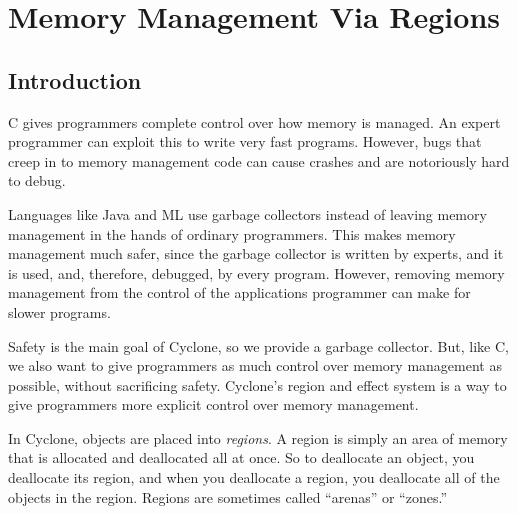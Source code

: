 \section{Memory Management Via Regions}


\subsection{Introduction}

C gives programmers complete control over how memory is managed.  An
expert programmer can exploit this to write very fast programs.
However, bugs that creep in to memory management code can cause
crashes and are notoriously hard to debug.

Languages like Java and ML use garbage collectors instead of leaving
memory management in the hands of ordinary programmers.  This makes
memory management much safer, since the garbage collector is written
by experts, and it is used, and, therefore, debugged, by every
program.  However, removing memory management from the control of the
applications programmer can make for slower programs.

Safety is the main goal of Cyclone, so we provide a garbage collector.
But, like C, we also want to give programmers as much control over
memory management as possible, without sacrificing safety.  Cyclone's
region and effect system is a way to give programmers more explicit
control over memory management.

In Cyclone, objects are placed into \emph{regions}.  A region is
simply an area of memory that is allocated and deallocated all at
once.  So to deallocate an object, you deallocate its region, and
when you deallocate a region, you deallocate all of the objects in the
region.  Regions are sometimes called ``arenas'' or ``zones.''

